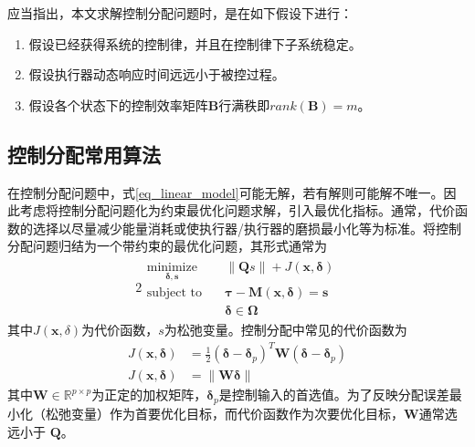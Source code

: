 应当指出，本文求解控制分配问题时，是在如下假设下进行：
\begin{enumerate}
	\item 假设已经获得系统的控制律，并且在控制律下子系统稳定。
	\item 假设执行器动态响应时间远远小于被控过程。
	\item 假设各个状态下的控制效率矩阵$\bm{B}$行满秩即$rank(\bm{B})=m$。
\end{enumerate}
%
\subsection{控制分配常用算法}
%
在控制分配问题中，式\eqref{eq_linear_model}可能无解，若有解则可能解不唯一。因此考虑将控制分配问题化为约束最优化问题求解，引入最优化指标。通常，代价函数的选择以尽量减少能量消耗或使执行器/执行器的磨损最小化等为标准。将控制分配问题归结为一个带约束的最优化问题，其形式通常为\cite{Johansen_2013}
\begin{alignat}{2}
\begin{split}
\mathop {{\text{minimize}}}\limits_{\bm{\delta},\bm{s}}\quad&{\|\bm{Q} s\|+J(\bm{x},\bm{\delta})} \\
\mbox{subject to}\quad
&\bm{\tau} -\bm{M}(\bm{x}, \bm{\delta})=\bm{s} \\
&\bm{\delta} \in \bm{\Omega }
\end{split} \label{eq_allo}
\end{alignat}
其中$ J(\bm{x},\delta) $为代价函数，$ s $为松弛变量。控制分配中常见的代价函数为
\begin{align}
J(\bm{x},\bm{\delta}) & =\frac{1}{2}\left(\bm{\delta}-\bm{\delta}_{p}\right)^{T} \bm{W}\left(\bm{\delta}-\bm{\delta}_{p}\right) \\
J(\bm{x},\bm{\delta}) & =\|\bm{W} \bm{\delta}\|
\end{align}
其中$\bm{W} \in \mathbb{R}^{p \times p}$为正定的加权矩阵，$ \bm{\delta}_{p} $是控制输入的首选值。为了反映分配误差最小化（松弛变量）作为首要优化目标，而代价函数作为次要优化目标，$ \bm{W} $通常选远小于
$ \bm{Q} $。

